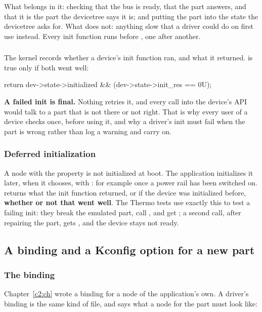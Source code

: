 \noindent What belongs in it: checking that the bus is ready, that the part answers, and that it is
the part the devicetree says it is; and putting the part into the state the devicetree asks for.
What does not: anything slow that a driver could do on first use instead. Every init function runs
before , one after another.

\subsubsection{}
The kernel records whether a device’s init function ran, and what it returned.
 is true only if both went well:

\begin{ccode}
return dev->state->initialized && (dev->state->init_res == 0U);
\end{ccode}

\noindent \textbf{A failed init is final.} Nothing retries it, and every call into the device’s API
would talk to a part that is not there or not right. That is why every user of a device checks
 once, before using it, and why a driver’s init must fail when the part is
wrong rather than log a warning and carry on.

\subsubsection{Deferred initialization}
A node with the property  is not initialized at boot. The application
initializes it later, when it chooses, with : for example once a power rail
has been switched on.  returns what the init function returned, or
 if the device was initialized before, \textbf{whether or not that went well}. The
Thermo tests use exactly this to test a failing init: they break the emulated part, call
, and get ; a second call, after repairing the part, gets
, and the device stays not ready.

\subsection{A binding and a Kconfig option for a new part}

\subsubsection{The binding}
Chapter~\ref{c2:ch} wrote a binding for a node of the application’s own. A driver’s binding is the
same kind of file, and says what a node for the part must look like:

